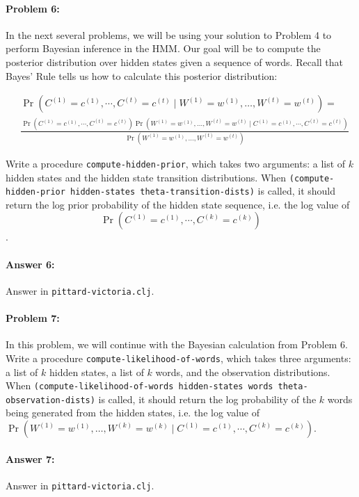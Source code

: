 \documentclass[10pt]{article}
\begin{document}
\hrulefill
\paragraph{Problem 6:}

In the next several problems, we will be using your solution to
Problem 4 to perform Bayesian inference in the HMM. Our goal will be
to compute the posterior distribution over hidden states given a
sequence of words. Recall that Bayes' Rule tells us how to calculate
this posterior distribution:

\begin{align}
&\Pr(C^{(1)}=c^{(1)},\cdots,C^{(t)}=c^{(t)} \mid W^{(1)}=w^{(1)},\dots,W^{(t)}=w^{(t)} ) = \\ &\frac{\Pr(C^{(1)}=c^{(1)},\cdots,C^{(t)}=c^{(t)}) \Pr( W^{(1)}=w^{(1)},\dots,W^{(t)}=w^{(t)} \mid C^{(1)}=c^{(1)},\cdots,C^{(t)}=c^{(t)})}{\Pr(W^{(1)}=w^{(1)},\dots,W^{(t)}=w^{(t)} )}
\end{align}

Write a procedure \texttt{compute-hidden-prior}, which takes two
arguments: a list of $k$ hidden states and the hidden state transition
distributions. When \texttt{(compute-hidden-prior hidden-states
  theta-transition-dists)} is called, it should return the log prior
probability of the hidden state sequence, i.e. the log value of
$$\Pr(C^{(1)}=c^{(1)},\cdots,C^{(k)}=c^{(k)})$$.


\paragraph{Answer 6:} Answer in
\texttt{pittard-victoria.clj}.


\hrulefill
\paragraph{Problem 7:}

In this problem, we will continue with the Bayesian calculation from
Problem 6. Write a procedure \texttt{compute-likelihood-of-words},
which takes three arguments: a list of $k$ hidden states, a list of
$k$ words, and the observation distributions. When
\texttt{(compute-likelihood-of-words hidden-states words
  theta-observation-dists)} is called, it should return the log
probability of the $k$ words being generated from the hidden states,
i.e. the log value of
$\Pr( W^{(1)}=w^{(1)},\dots,W^{(k)}=w^{(k)} \mid
C^{(1)}=c^{(1)},\cdots,C^{(k)}=c^{(k)})$.

\paragraph{Answer 7:} Answer in
\texttt{pittard-victoria.clj}.
\end{document}
